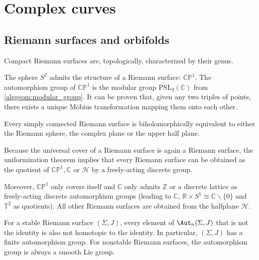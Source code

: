 \section{Complex curves}
\subsection{Riemann surfaces and orbifolds}

    \begin{property}
        Compact Riemann surfaces are, topologically, characterized by their genus.
    \end{property}

    \begin{example}\label{complex:riemann_sphere}
        The sphere $S^2$ admits the structure of a Riemann surface: $\mathbb{CP}^1$. The automorphism group of $\mathbb{CP}^1$ is the modular group $\mathrm{PSL}_2(\mathbb{C})$ from \cref{alggeom:modular_group}. It can be proven that, given any two triples of points, there exists a unique M\"obius transformation mapping them onto each other.
    \end{example}

    \begin{theorem}
        Every simply connected Riemann surface is biholomorphically equivalent to either the Riemann sphere, the complex plane or the upper half plane.
    \end{theorem}
    \begin{result}
        Because the universal cover of a Riemann surface is again a Riemann surface, the uniformization theorem implies that every Riemann surface can be obtained as the quotient of $\mathbb{CP}^1,\mathbb{C}$ or $\mathcal{H}$ by a freely-acting discrete group.

        Moreover, $\mathbb{CP}^1$ only covers itself and $\mathbb{C}$ only admits $\mathbb{Z}$ or a discrete lattice as freely-acting discrete automorphism groups (leading to $\mathbb{C}$, $\mathbb{R}\times S^1\cong\mathbb{C}\backslash\{0\}$ and $\mathbb{T}^2$ as quotients). All other Riemann surfaces are obtained from the halfplane $\mathcal{H}$.
    \end{result}

    \begin{property}
        For a stable Riemann surface $(\Sigma,J)$, every element of $\Aut_n(\Sigma,J)$ that is not the identity is also not homotopic to the identity. In particular, $(\Sigma,J)$ has a finite automorphism group. For nonstable Riemann surfaces, the automorphism group is always a smooth Lie group.
    \end{property}

